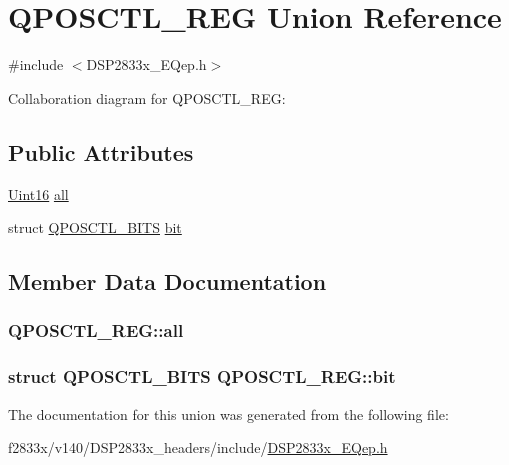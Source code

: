 \hypertarget{union_q_p_o_s_c_t_l___r_e_g}{}\section{Q\+P\+O\+S\+C\+T\+L\+\_\+\+R\+E\+G Union Reference}
\label{union_q_p_o_s_c_t_l___r_e_g}


{\ttfamily \#include $<$D\+S\+P2833x\+\_\+\+E\+Qep.\+h$>$}



Collaboration diagram for Q\+P\+O\+S\+C\+T\+L\+\_\+\+R\+E\+G\+:
\subsection*{Public Attributes}
\begin{DoxyCompactItemize}
\item 
\hyperlink{_d_s_p2833x___device_8h_a59a9f6be4562c327cbfb4f7e8e18f08b}{Uint16} \hyperlink{union_q_p_o_s_c_t_l___r_e_g_a011718d4ebee0a53854b0d72f9da5315}{all}
\item 
struct \hyperlink{struct_q_p_o_s_c_t_l___b_i_t_s}{Q\+P\+O\+S\+C\+T\+L\+\_\+\+B\+I\+T\+S} \hyperlink{union_q_p_o_s_c_t_l___r_e_g_ad968dde866010de4aedad589d26742cd}{bit}
\end{DoxyCompactItemize}


\subsection{Member Data Documentation}
\hypertarget{union_q_p_o_s_c_t_l___r_e_g_a011718d4ebee0a53854b0d72f9da5315}{}
\subsubsection[{all}]{ Q\+P\+O\+S\+C\+T\+L\+\_\+\+R\+E\+G\+::all}\label{union_q_p_o_s_c_t_l___r_e_g_a011718d4ebee0a53854b0d72f9da5315}
\hypertarget{union_q_p_o_s_c_t_l___r_e_g_ad968dde866010de4aedad589d26742cd}{}
\subsubsection[{bit}]{\setlength{\rightskip}{0pt plus 5cm}struct {\bf Q\+P\+O\+S\+C\+T\+L\+\_\+\+B\+I\+T\+S} Q\+P\+O\+S\+C\+T\+L\+\_\+\+R\+E\+G\+::bit}\label{union_q_p_o_s_c_t_l___r_e_g_ad968dde866010de4aedad589d26742cd}


The documentation for this union was generated from the following file\+:\begin{DoxyCompactItemize}
\item 
f2833x/v140/\+D\+S\+P2833x\+\_\+headers/include/\hyperlink{_d_s_p2833x___e_qep_8h}{D\+S\+P2833x\+\_\+\+E\+Qep.\+h}\end{DoxyCompactItemize}
